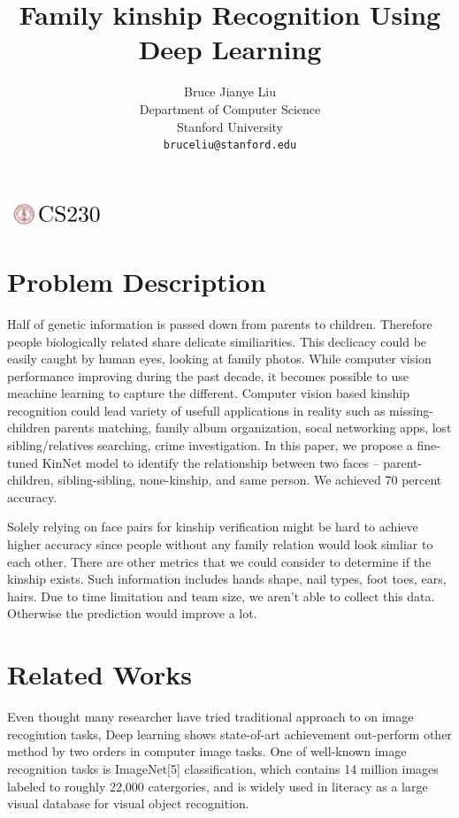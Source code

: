 \documentclass{article}
\title{Family kinship Recognition Using Deep Learning}
\author{
  Bruce Jianye Liu\\
  Department of Computer Science\\
  Stanford University\\
  \texttt{bruceliu@stanford.edu} \\
}
\begin{document}

\begin{center}
\includegraphics[width=3cm, height=0.7cm]{CS230}
\end{center}

\maketitle

\section{Problem Description}
Half of genetic information is passed down from parents to children. Therefore
people biologically related share delicate similiarities. This declicacy could
be easily caught by human eyes, looking at family photos. While computer vision
performance improving during the past decade, it becomes possible to use
meachine learning to capture the different. Computer vision based kinship
recognition could lead variety of usefull applications in reality such as
missing-children parents matching, family album organization, socal networking
apps, lost sibling/relatives searching, crime investigation. In this paper, we
propose a fine-tuned KinNet model to identify the relationship between two
faces -- parent-children, sibling-sibling, none-kinship, and same person. We
achieved 70 percent accuracy.

Solely relying on face pairs for kinship verification might be hard to achieve
higher accuracy since people without any family relation would look simliar to
each other. There are other metrics that we could consider to determine if the
kinship exists. Such information includes hands shape, nail types, foot toes,
ears, hairs. Due to time limitation and team size, we aren't able to collect
this data. Otherwise the prediction would improve a lot.

\section{Related Works}

Even thought many researcher have tried traditional approach to on image
recogintion tasks, Deep learning shows state-of-art achievement out-perform
other method by two orders in computer image tasks. One of well-known image
recognition tasks is ImageNet[5] classification, which contains 14
million images labeled to roughly 22,000 catergories, and is widely used in
literacy as a large visual database for visual object recognition.
\end{document}
